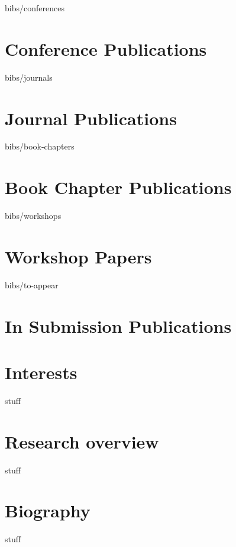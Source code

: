 \documentclass[a4paper,11pt]{article}
\begin{document}
\maketitle
 
\begin{btSect}{bibs/conferences}
\section{Conference Publications}
\btPrintAll
\end{btSect}

\begin{btSect}{bibs/journals}
\section{Journal Publications}
\btPrintAll
\end{btSect}

\begin{btSect}{bibs/book-chapters}
\section{Book Chapter Publications}
\btPrintAll
\end{btSect}

\begin{btSect}{bibs/workshops}
\section{Workshop Papers}
\btPrintAll
\end{btSect}


\begin{btSect}{bibs/to-appear}
\section{In Submission Publications}
\btPrintAll
\end{btSect}

\section{Interests}
stuff

\section{Research overview}
stuff

\section{Biography}
stuff
\end{document}
